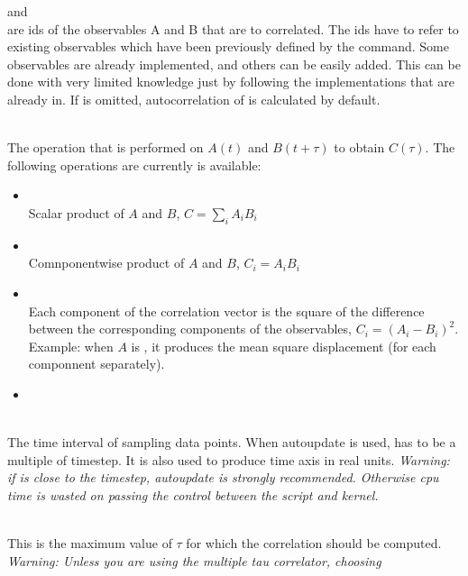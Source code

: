 \begin{arguments}
\item {} and  \\ 
  are ids of the observables A and B that are to correlated. The ids have to refer to existing 
  observables which have been previously defined by the  command.
  Some observables are already implemented, and others can be easily added. This can be done
  with very limited \es{} knowledge just by following the implementations that are already
  in. If  is omitted, autocorrelation of  is calculated by default.
\item {} \\
  The operation that is performed on $A(t)$ and $B(t+\tau)$ to obtain $C(\tau)$. 
  The following operations are currently is available:
  \begin{itemize}
    \item {} \\
    Scalar product of $A$ and $B$, \ie $C=\sum\limits_{i} A_i B_i$
    \item {} \\
    Comnponentwise product of $A$ and $B$, \ie $C_i = A_i B_i$
    \item {} \\
    Each component of the correlation vector is the square of the difference between the 
    corresponding components of the observables, \ie $C_i = (A_i-B_i)^2$. 
    Example: when $A$ is , it produces the mean square displacement
    (for each componnent separately).
    \item {}
  \end{itemize}
\item {} \\
  The time interval of sampling data points. When autoupdate is used,  has
  to be a multiple of timestep. It is also used to produce time axis in real units.
  \textit{Warning: if  is close to the timestep, autoupdate is strongly recommended.
  Otherwise cpu time is wasted on passing the control between the script and kernel.}
\item {} \\
  This is the maximum value of $\tau$ for which the correlation should be computed.
  \textit{Warning: Unless you are using the multiple tau correlator, choosing 
}
\end{arguments}
